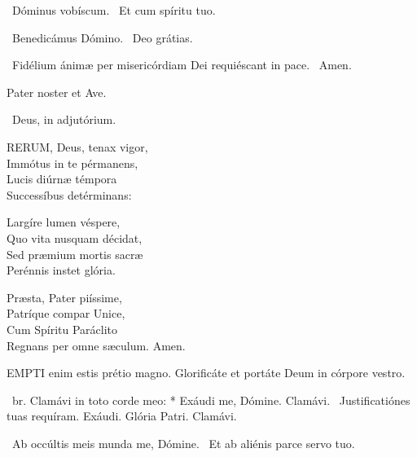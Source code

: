 

\V\ Dóminus vobíscum. \R\ Et cum spíritu tuo.

\V\ Benedicámus Dómino. \R\ Deo grátias.

\V\ Fidélium ánimæ per misericórdiam Dei requiéscant in pace. \R\ Amen.



Pater noster et Ave.

\V\ Deus, in adjutórium.


\lettrine[lines=2]{R}{ERUM}, Deus, tenax vigor,\\
Immótus in te pérmanens,\\
Lucis diúrnæ témpora\\
Successíbus detérminans:

Largíre lumen véspere,\\
Quo vita nusquam décidat,\\
Sed præmium mortis sacræ\\
Perénnis instet glória.

Præsta, Pater piíssime,\\
Patríque compar Unice,\\
Cum Spíritu Paráclito\\
Regnans per omne sæculum. Amen.





\lettrine[lines=2]{E}{MPTI} enim estis prétio magno. Glorificáte et portáte Deum in córpore vestro.

\R\ br. Clamávi in toto corde meo: * Exáudi me, Dómine. Clamávi. \V\ Justificatiónes tuas requíram. Exáudi. Glória Patri. Clamávi.

\V\ Ab occúltis meis munda me, Dómine. \R\ Et ab aliénis parce servo tuo.


